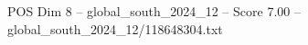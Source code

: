 \begin{textsample}{POS Dim 8 – global\_south\_2024\_12 – Score 7.00 – global\_south\_2024\_12/118648304.txt}
\end{textsample}

